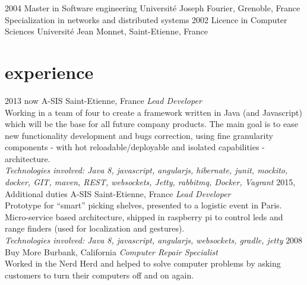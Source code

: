 \documentclass[]{k-cv} %
\begin{document}
\begin{entrylist}
\entry
{2004}
{Master {\normalfont in Software engineering}}
{Universit\'{e} Joseph Fourier, Grenoble, France}
{Specialization in networks and distributed systems}
\entry
{2002}
{Licence {\normalfont in Computer Sciences}}
{Universit\'{e} Jean Monnet, Saint-Etienne, France}
{}
\end{entrylist}

\section{experience}

\begin{entrylist}
\entry
{2013 \to now}
{A-SIS}
{Saint-Etienne, France}
{\emph{Lead Developer} \\
Working in a team of four to create a framework written in Java (and Javascript) which
 will be the base for all future company products.
The main goal is to ease new functionality development and bugs correction,
  using fine granularity components - with hot reloadable/deployable and isolated capabilities - architecture. \\
\emph{
Technologies involved:
Java 8, javascript, angularjs, hibernate, junit, mockito, docker,
GIT, maven, REST, websockets, Jetty, rabbitmq, Docker, Vagrant
}}
\entry
{2015, Additional duties}
{A-SIS}
{Saint-Etienne, France}
{\emph{Lead Developer} \\
Prototype for “smart” picking shelves, presented to a logistic event in Paris.
Micro-service based architecture, shipped in raspberry pi to control leds and range finders
(used for localization and gestures). \\
\emph{
Technologies involved:
Java 8, javascript, angularjs, websockets,  gradle, jetty
}}
\entry
{2008 }
{Buy More}
{Burbank, California}
{\emph{Computer Repair Specialist} \\
Worked in the Nerd Herd and helped to solve computer problems by asking
customers to turn their computers off and on again.}
\end{entrylist}
\end{document}
